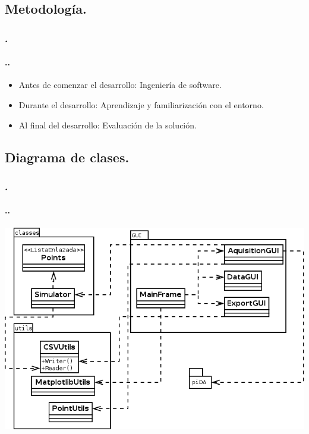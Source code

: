 \documentclass{beamer}
\newenvironment{slide}	%
{\begin{frame}[environment=slide]
\frametitle{\insertsectionnumber.\insertsection}
\framesubtitle{\setlength{\parindent}{2ex} \insertsectionnumber.\insertsubsectionnumber.\insertsubsection}}
{\end{frame}}
\begin{document}
\subsection{Metodología.}
\begin{slide}
	\begin{itemize}
		\item Antes de comenzar el desarrollo: Ingeniería de software. \pause
		\item Durante el desarrollo: Aprendizaje y familiarización con el entorno. \pause
		\item Al final del desarrollo: Evaluación de la solución.	
	\end{itemize}
\end{slide}

\subsection{Diagrama de clases.}
\begin{slide}
	\includegraphics[width=1\textwidth]{classes.png}
\end{slide}
\end{document}
